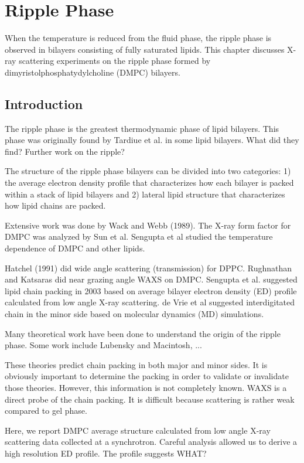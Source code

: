 \chapter{Ripple Phase}
When the temperature is reduced from the fluid phase, 
the ripple phase is observed in bilayers consisting of fully saturated lipids.
This chapter discusses X-ray scattering experiments on the ripple phase 
formed by dimyristolphosphatydylcholine (DMPC) bilayers. 

\section{Introduction}
The ripple phase is the greatest thermodynamic phase of lipid bilayers.
This phase was originally found by Tardiue et al. in some lipid bilayers.
What did they find? Further work on the ripple? 

The structure of the ripple phase bilayers can be divided into two categories:
1) the average electron density profile that characterizes how each bilayer
is packed within a stack of lipid bilayers and 2) lateral lipid structure
that characterizes how lipid chains are packed.

Extensive work was done by Wack and Webb (1989). The X-ray form factor
for DMPC was analyzed by Sun et al. Sengupta et al studied the 
temperature dependence of DMPC and other lipids.

Hatchel (1991) did wide angle scattering (transmission) for DPPC.
Rughnathan and Katsaras did near grazing angle WAXS on DMPC.
Sengupta et al. suggested lipid chain packing in 2003 based on 
average bilayer electron density (ED) profile calculated from low angle
X-ray scattering. de Vrie et al suggested interdigitated chain in the
minor side based on molecular dynamics (MD) simulations.

Many theoretical work have been done to understand the origin of
the ripple phase. Some work include Lubensky and Macintosh, ...

These theories predict chain packing in both major
and minor sides. It is obviously important to determine the packing
in order to validate or invalidate those theories. However, this information
is not completely known. WAXS is a direct probe of the chain packing.
It is difficult because scattering is rather weak compared to gel phase. 

Here, we report DMPC average structure calculated from
low angle X-ray scattering data collected at a synchrotron.
Careful analysis allowed us to derive a high resolution ED profile.
The profile suggests WHAT? 

